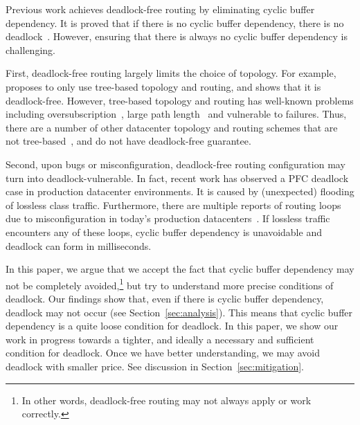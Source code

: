 Previous work achieves deadlock-free routing by eliminating cyclic buffer dependency.
It is proved that if there is no cyclic buffer dependency, there is no deadlock~\cite{deadlockfree}.
However, ensuring that there is always no cyclic buffer dependency is challenging.

First, deadlock-free routing largely limits the choice of topology. For example, \cite{tcpbolt}
proposes to only use tree-based topology and routing, and shows that it is deadlock-free. 
However, tree-based topology and routing has well-known problems including oversubscription~\cite{fattree},
large path length~\cite{jellyfish} and vulnerable to failures.
Thus, there are a number of other datacenter topology and routing schemes that are not 
tree-based~\cite{bcube, camcube, jellyfish}, and do not have deadlock-free guarantee. 

Second, upon bugs or misconfiguration, deadlock-free routing configuration may turn into
deadlock-vulnerable. In fact, recent work has observed a PFC deadlock case in production
datacenter environments\cite{rdmascale}. It is caused by (unexpected) flooding of 
lossless class traffic. Furthermore, there are multiple reports of routing loops due to misconfiguration
in today's production datacenters~\cite{everflow, libra}. If lossless traffic encounters
any of these loops, cyclic buffer dependency is unavoidable and deadlock can form in milliseconds.

In this paper, we argue that we accept the fact that cyclic buffer dependency may not be completely 
avoided,\footnote{In other words, deadlock-free routing may not always apply or work correctly.}
but try to understand more precise conditions of deadlock. Our findings show that,
even if there is cyclic buffer dependency, deadlock may not occur (see Section~\ref{sec:analysis}).
This means that cyclic buffer dependency is a quite loose condition for deadlock.
In this paper, we show our work in progress towards a tighter, and ideally a necessary and sufficient 
condition for deadlock. Once we have better understanding, we may avoid deadlock with smaller price. 
See discussion in Section~\ref{sec:mitigation}.


